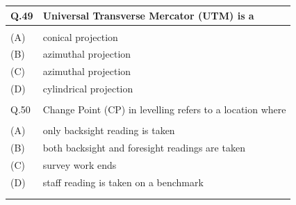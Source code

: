 \documentclass[12pt]{article}
\begin{document}
\begin{table}[H]
\renewcommand{\arraystretch}{3}
\setlength{\tabcolsep}{8pt}
\begin{tabular}{|l|p{15cm}|}
\hline
 
Q.49& Universal Transverse Mercator (UTM) is a\\ \hline 
 & \\ \hline
(A)&conical projection\\ \hline
(B)&azimuthal projection\\ \hline
(C)&azimuthal projection\\ \hline
(D)&cylindrical projection\\ \hline
 & \\ \hline

Q.50 & Change Point (CP) in levelling refers to a location where\\ \hline
 & \\ \hline
(A)&only backsight reading is taken\\ \hline
(B)&both backsight and foresight readings are taken\\ \hline
(C)&survey work ends\\ \hline
(D)&staff reading is taken on a benchmark\\ \hline

& \\ 
& \\ \hline

\end{tabular}
\end{table}
\end{document}
